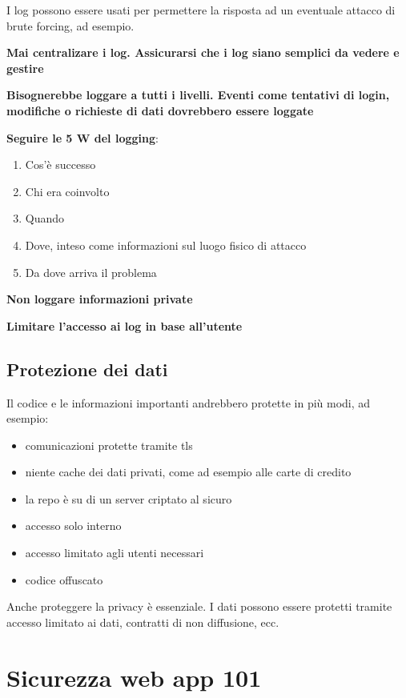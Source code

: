 \documentclass[11pt,a4paper]{book}
\begin{document}
I log possono essere usati per permettere la risposta ad un eventuale attacco di brute forcing, ad esempio.

\textbf{Mai centralizare i log. Assicurarsi che i log siano semplici da vedere e gestire}

\textbf{Bisognerebbe loggare a tutti i livelli. Eventi come tentativi di login, modifiche o richieste di dati dovrebbero essere loggate}

\textbf{Seguire le 5 W del logging}:
\begin{enumerate}
	\item Cos'è successo
	\item Chi era coinvolto
	\item Quando
	\item Dove, inteso come informazioni sul luogo fisico di attacco
	\item Da dove arriva il problema
\end{enumerate}

\textbf{Non loggare informazioni private}

\textbf{Limitare l'accesso ai log in base all'utente}

\section{Protezione dei dati}
Il codice e le informazioni importanti andrebbero protette in più modi, ad esempio:
\begin{itemize}
	\item comunicazioni protette tramite tls
	\item niente cache dei dati privati, come ad esempio alle carte di credito
	\item la repo è su di un server criptato al sicuro
	\item accesso solo interno
	\item accesso limitato agli utenti necessari
	\item codice offuscato
\end{itemize}

Anche proteggere la privacy è essenziale. I dati possono essere protetti tramite accesso limitato ai dati, contratti di non diffusione, ecc.

\chapter{Sicurezza web app 101}
\end{document}
